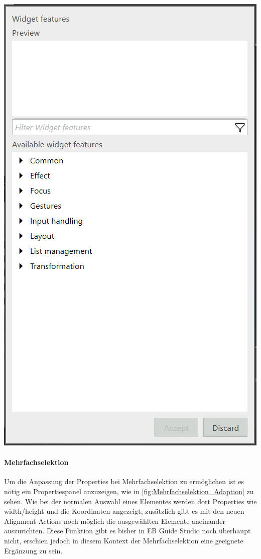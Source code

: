 \begin{center}
  \includegraphics[scale=0.5]{figures/WidgetFeatureProperty_Adaption.png}
  \label{fig:FeatureProperty_Adaption}
\end{center}


\paragraph{Mehrfachselektion}
Um die Anpassung der Properties bei Mehrfachselektion zu ermöglichen ist es nötig ein Propertiespanel anzuzeigen, wie in \cref{fig:Mehrfachselektion_Adaption} zu sehen.
Wie bei der normalen Auswahl eines Elementes werden dort Properties wie width/height und die Koordinaten angezeigt, zusätzlich gibt es mit den neuen Alignment Actions noch möglich die ausgewählten Elemente aneinander auszurichten.
Diese Funktion gibt es bisher in EB Guide Studio noch überhaupt nicht, erschien jedoch in diesem Kontext der Mehrfachselektion eine geeignete Ergänzung zu sein.

